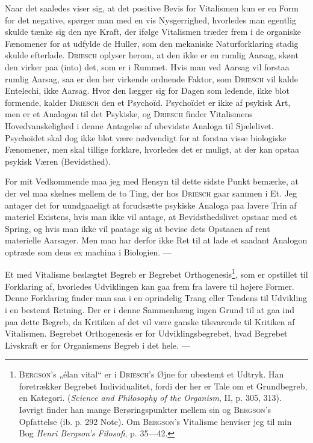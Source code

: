 \documentclass[12pt]{article}
\newcommand{\opage}[1]{\marginnote{\footnotesize\textit{[#1]}}}
\begin{document}
Naar det saaledes viser sig, at det positive Bevis for Vitalismen kun er en
Form for det negative, spørger man med en vis Nysgerrighed, hvorledes man
egentlig skulde tænke sig den nye Kraft, der ifølge Vitalismen træder frem i de organiske
Fænomener for at udfylde de Huller, som den mekaniske Naturforklaring stadig
\setcounter{footnote}{0}%
\opage{55}skulde efterlade. \textsc{Driesch} oplyser herom, at den ikke er en rumlig Aarsag, skønt
den virker paa (into) det, som er i Rummet. Hvis man ved Aarsag vil forstaa rumlig
Aarsag, saa er den her virkende ordnende Faktor, som \textsc{Driesch} vil kalde Entelechi,
ikke Aarsag. Hvor den lægger sig for Dagen som ledende, ikke blot formende,
kalder \textsc{Driesch} den et Psychoïd. Psychoïdet er ikke af psykisk Art, men er et
Analogon til det Psykiske, og \textsc{Driesch} finder Vitalismens Hovedvanskelighed i denne
Antagelse af ubevidste Analoga til Sjælelivet. Psychoïdet skal dog ikke blot være
nødvendigt for at forstaa visse biologiske Fænomener, men skal tillige forklare,
hvorledes det er muligt, at der kan opstaa psykisk Væren (Bevidsthed).

For mit Vedkommende maa jeg med Hensyn til dette sidste Punkt bemærke,
at der vel maa skelnes mellem de to Ting, der hos \textsc{Driesch} gaar sammen i Et.
Jeg antager det for uundgaaeligt at forudsætte psykiske Analoga paa lavere Trin af
materiel Existens, hvis man ikke vil antage, at Bevidsthedslivet opstaar med et
Spring, og hvis man ikke vil paatage sig at bevise dets Opstaaen af rent materielle
Aarsager. Men man har derfor ikke Ret til at lade et saadant Analogon optræde
som deus ex machina i Biologien. ---

Et med Vitalisme beslægtet Begreb er Begrebet
Orthogenesis\footnote{\textsc{Bergson}'s „élan vital“ er i \textsc{Driesch}'s
Øjne for ubestemt et Udtryk. Han foretrækker Begrebet Individualitet, fordi der
her er Tale om et Grundbegreb, en Kategori. (\textit{Science and Philosophy of the
Organism}, II, p. 305, 313). Iøvrigt finder han mange Berøringspunkter mellem sin
og \textsc{Bergson}'s Opfattelse (ib. p. 292 Note). Om \textsc{Bergson}'s Vitalisme
henviser jeg til min Bog \textit{Henri Bergson's Filosofi}, p. 35---42.}, som er opstillet
til Forklaring af, hvorledes Udviklingen kan gaa frem fra lavere til højere Former.
Denne Forklaring finder man saa i en oprindelig Trang eller Tendens til Udvikling
i en bestemt Retning. Der er i denne Sammenhæng ingen Grund til at gaa ind paa
dette Begreb, da Kritiken af det vil være ganske tilsvarende til Kritiken af
Vitalismen. Begrebet Orthogenesis er for Udviklingsbegrebet, hvad Begrebet Livskraft er
for Organismens Begreb i det hele. ---
\end{document}
